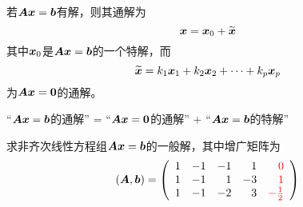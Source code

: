 \begin{frame}
  \begin{dingli}
    若$\A\xx=\bb$有解，则其通解为
    $$
    \xx=\xx_0+\widetilde {\xx}
    $$
    其中$\xx_0$是$\A\xx=\bb$的一个特解，而
    $$
    \widetilde{\xx}=k_1\xx_1+k_2\xx_2+\cd+k_p\xx_p
    $$
    为$\A\xx=\zero$的通解。
  \end{dingli}

\end{frame}


\begin{frame}
  \begin{zhu*}
    “$\A\xx=\bb$的通解” =  “$\A\xx=\zero$的通解” + “$\A\xx=\bb$的特解”
  \end{zhu*}
\end{frame}

\begin{frame}
  \begin{li}[$\bigstar$]
    求非齐次线性方程组$\A\xx=\bb$的一般解，其中增广矩阵为
    $$
    (\A,\bb) = \left(
      \begin{array}{rrrrr}
        1&-1&-1& 1&\red{0}\\
        1&-1& 1&-3&\red{1}\\
        1&-1&-2& 3&\red{-\frac12}
      \end{array}
    \right)
    $$
  \end{li}
\end{frame}


